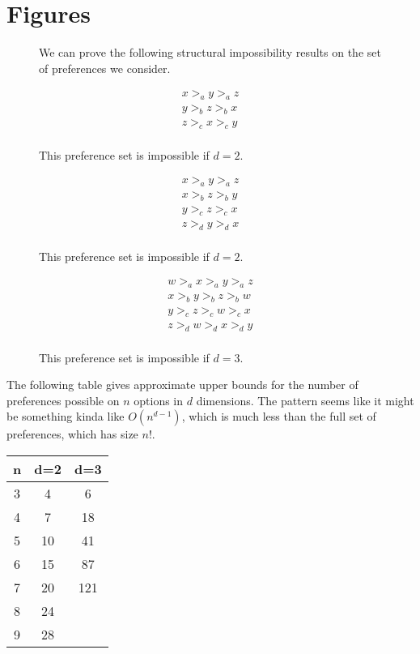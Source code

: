 \documentclass[12pt]{article}
\newcommand{\1}[1]{\mathds{1}[{#1}]}
\begin{document}
\clearpage
\appendix
\section{Figures}
  \begin{figure}[ht]

    We can prove the following structural impossibility results
    on the set of preferences we consider.

    \begin{minipage}[b]{0.25\linewidth}
      \centering
      \begin{align*}
        x >_a y >_a z \\
        y >_b z >_b x \\
        z >_c x >_c y \\
      \end{align*}
      \caption{This preference set is impossible if $d=2$.}
      \label{fig:figure1}
    \end{minipage}
    \hspace{0.5cm}
    \begin{minipage}[b]{0.25\linewidth}
      \centering
      \begin{align*}
        x >_a y >_a z \\
        x >_b z >_b y \\
        y >_c z >_c x \\
        z >_d y >_d x \\
      \end{align*}
      \caption{This preference set is impossible if $d=2$.}
      \label{fig:figure2}
    \end{minipage}
    \hspace{0.5cm}
    \begin{minipage}[b]{0.25\linewidth}
      \centering
      \begin{align*}
        w >_a x >_a y >_a z \\
        x >_b y >_b z >_b w \\
        y >_c z >_c w >_c x \\
        z >_d w >_d x >_d y \\
      \end{align*}
      \caption{This preference set is impossible if $d=3$.}
      \label{fig:cycle4}
    \end{minipage}
  \end{figure}

  The following table gives approximate upper bounds for
  the number of preferences possible on $n$ options in $d$
  dimensions. The pattern seems like it might be something
  kinda like $O(n^{d-1})$, which is much less than the full
  set of preferences, which has size $n!$.
  \begin{tabular}{c | c c }
    n & d=2 & d=3 \\
    \hline
    3  &  4   & 6   \\
    4  &  7   & 18  \\
    5  &  10  & 41  \\
    6  &  15  & 87  \\
    7  &  20  & 121 \\
    8  &  24  \\
    9  &  28  \\
  \end{tabular}
\end{document}
